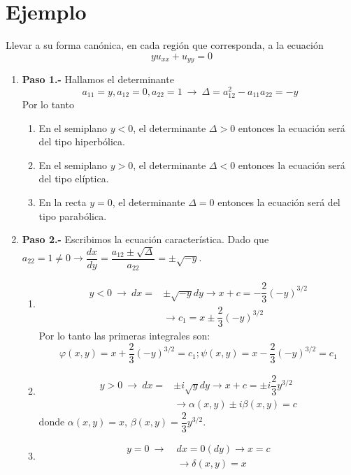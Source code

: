 \documentclass[../main]{subfiles}
\begin{document}
\section*{Ejemplo}
Llevar a su forma canónica, en cada región que corresponda, a la ecuación
$$yu_{xx}+u_{yy}=0$$
\begin{enumerate}
    \item[] \textbf{Paso 1.-} Hallamos el determinante
    $$a_{11}=y, a_{12}=0, a_{22}=1 \ \rightarrow \ \Delta=a^2_{12}-a_{11}a_{22}=-y$$
    Por lo tanto
    \begin{enumerate}[label=(\alph*)]
        \item En el semiplano $y<0$, el determinante $\Delta>0$ entonces la ecuación será del tipo hiperbólica.
        \item En el semiplano $y>0$, el determinante $\Delta<0$ entonces la ecuación será del tipo elíptica.
        \item En la recta $y=0$, el determinante $\Delta=0$ entonces la ecuación será del tipo parabólica.
    \end{enumerate}
    \item[] \textbf{Paso 2.-} Escribimos la ecuación característica. Dado que $a_{22}=1\neq 0 \rightarrow \dfrac{dx}{dy}=\dfrac{a_{12}\pm \sqrt{\Delta}}{a_{22}}=\pm \sqrt{-y}$.
    \begin{enumerate}[label=(\alph*)]
        \item 
        \begin{align*}
            y<0 \ \rightarrow \ dx=&\pm \sqrt{-y}dy \rightarrow x+c=-\dfrac{2}{3}(-y)^{3/2}\\
            &\rightarrow c_1=x\pm\dfrac{2}{3}(-y)^{3/2}
        \end{align*}
        Por lo tanto las primeras integrales son:
        $$\varphi(x,y)=x+\dfrac{2}{3}(-y)^{3/2}=c_1; \psi(x,y)=x-\dfrac{2}{3}(-y)^{3/2}=c_1$$
        \item 
        \begin{align*}
            y>0 \ \rightarrow \ dx=&\pm i \sqrt{y}dy \rightarrow x+c=\pm i\dfrac{2}{3}y^{3/2}\\
            &\rightarrow \alpha(x,y)\pm i\beta(x,y)=c
        \end{align*}
        donde $\alpha(x,y)=x$, $\beta(x,y)=\dfrac{2}{3}y^{3/2}$.
        \item 
        \begin{align*}
            y=0 \ \rightarrow \ &dx=0(dy) \rightarrow x=c\\
            &\rightarrow \delta(x,y)=x

\end{align*}
\end{enumerate}
\end{enumerate}
\end{document}
